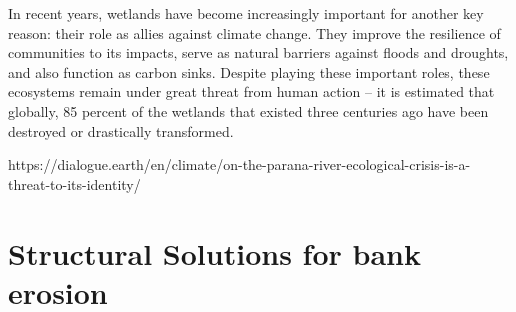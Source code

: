 In recent years, wetlands have become increasingly important for another key reason: their role as allies against climate change. They improve the resilience of communities to its impacts, serve as natural barriers against floods and droughts, and also function as carbon sinks. Despite playing these important roles, these ecosystems remain under great threat from human action – it is estimated that globally, 85 percent of the wetlands that existed three centuries ago have been destroyed or drastically transformed. 

https://dialogue.earth/en/climate/on-the-parana-river-ecological-crisis-is-a-threat-to-its-identity/


\newpage

\section{Structural Solutions for bank erosion}
\label{section_8.2}

